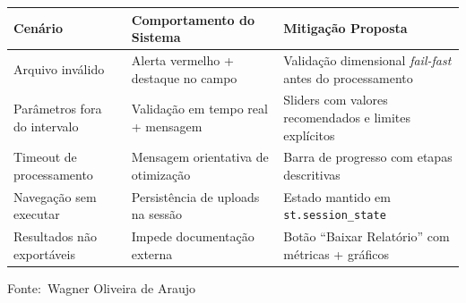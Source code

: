 \documentclass[12pt,a4paper]{article}
\newcommand{\oautor}{Wagner Oliveira de Araujo}
\begin{document}
\begin{quadro}[ht]
\begin{center}
\small
\caption{Tratamento de exceções e usabilidade}
\label{quadro:excecoes}
\begin{threeparttable}
\begin{tabularx}{\textwidth}{|l|X|X|} \hline
\textbf{Cenário} & \textbf{Comportamento do Sistema} & \textbf{Mitigação Proposta} \\ \hline
Arquivo inválido & Alerta vermelho + destaque no campo & Validação dimensional \textit{fail-fast} antes do processamento \\ \hline
Parâmetros fora do intervalo & Validação em tempo real + mensagem & Sliders com valores recomendados e limites explícitos \\ \hline
Timeout de processamento & Mensagem orientativa de otimização & Barra de progresso com etapas descritivas \\ \hline
Navegação sem executar & Persistência de uploads na sessão & Estado mantido em \texttt{st.session\_state} \\ \hline
Resultados não exportáveis & Impede documentação externa & Botão ``Baixar Relatório'' com métricas + gráficos \\ \hline
\end{tabularx}
\begin{tablenotes}[flushleft]
\footnotesize
\item Fonte:~\oautor
\end{tablenotes}
\end{threeparttable}
\end{center}
\end{quadro}
\end{document}
